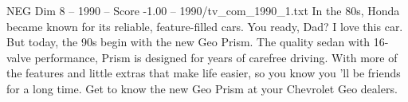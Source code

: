 \begin{textsample}{NEG Dim 8 – 1990 – Score -1.00 – 1990/tv\_com\_1990\_1.txt}  \label{ex:f8_neg_030}
In the 80s, Honda became known for its reliable, feature-filled cars.
You ready, Dad?
I love this car.
But today, the 90s begin with the new Geo Prism.
The quality sedan with 16-valve performance, Prism is designed for years of carefree driving.
With more of the features and little extras that make life easier, so you know you 'll be friends for a long time.
Get to know the new Geo Prism at your Chevrolet Geo dealers.

\end{textsample}
